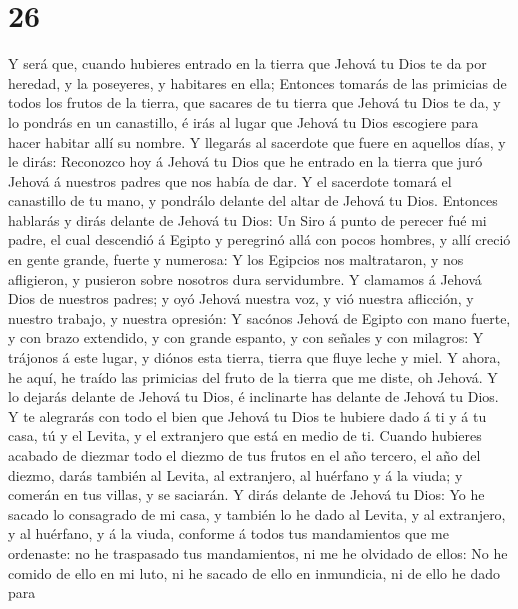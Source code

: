 \hypertarget{section-25}{%
\section{26}\label{section-25}}

 Y será que, cuando hubieres entrado en la tierra que
Jehová tu Dios te da por heredad, y la poseyeres, y habitares en ella;
 Entonces tomarás de las primicias de todos los frutos de
la tierra, que sacares de tu tierra que Jehová tu Dios te da, y lo
pondrás en un canastillo, é irás al lugar que Jehová tu Dios escogiere
para hacer habitar allí su nombre.  Y llegarás al
sacerdote que fuere en aquellos días, y le dirás: Reconozco hoy á Jehová
tu Dios que he entrado en la tierra que juró Jehová á nuestros padres
que nos había de dar.  Y el sacerdote tomará el canastillo
de tu mano, y pondrálo delante del altar de Jehová tu Dios.
 Entonces hablarás y dirás delante de Jehová tu Dios: Un
Siro á punto de perecer fué mi padre, el cual descendió á Egipto y
peregrinó allá con pocos hombres, y allí creció en gente grande, fuerte
y numerosa:  Y los Egipcios nos maltrataron, y nos
afligieron, y pusieron sobre nosotros dura servidumbre.  Y
clamamos á Jehová Dios de nuestros padres; y oyó Jehová nuestra voz, y
vió nuestra aflicción, y nuestro trabajo, y nuestra opresión:
 Y sacónos Jehová de Egipto con mano fuerte, y con brazo
extendido, y con grande espanto, y con señales y con milagros:
 Y trájonos á este lugar, y diónos esta tierra, tierra que
fluye leche y miel.  Y ahora, he aquí, he traído las
primicias del fruto de la tierra que me diste, oh Jehová. Y lo dejarás
delante de Jehová tu Dios, é inclinarte has delante de Jehová tu Dios.
 Y te alegrarás con todo el bien que Jehová tu Dios te
hubiere dado á ti y á tu casa, tú y el Levita, y el extranjero que está
en medio de ti.  Cuando hubieres acabado de diezmar todo
el diezmo de tus frutos en el año tercero, el año del diezmo, darás
también al Levita, al extranjero, al huérfano y á la viuda; y comerán en
tus villas, y se saciarán.  Y dirás delante de Jehová tu
Dios: Yo he sacado lo consagrado de mi casa, y también lo he dado al
Levita, y al extranjero, y al huérfano, y á la viuda, conforme á todos
tus mandamientos que me ordenaste: no he traspasado tus mandamientos, ni
me he olvidado de ellos:  No he comido de ello en mi
luto, ni he sacado de ello en inmundicia, ni de ello he dado para
